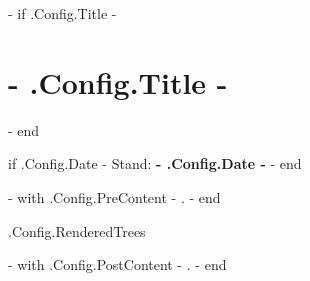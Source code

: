 \documentclass[10pt,paper=a4,ngerman,parskip,DIV=15,BCOR=0mm,%
{{ if .Config.DocumentOptions -}}
{{ .Config.DocumentOptions }}%
{{- end }}%
]{scrartcl}
\begin{document}
{{- if .Config.Title -}}
\section*{ {{- .Config.Title -}} }
{{- end }}

{{ if .Config.Date -}}
Stand: \textbf{ {{- .Config.Date -}} }
{{- end }}


{{- with .Config.PreContent -}}
{{ . }}
{{- end }}


{{ .Config.RenderedTrees }}


{{- with .Config.PostContent -}}
{{ . }}
{{- end }}
\end{document}
